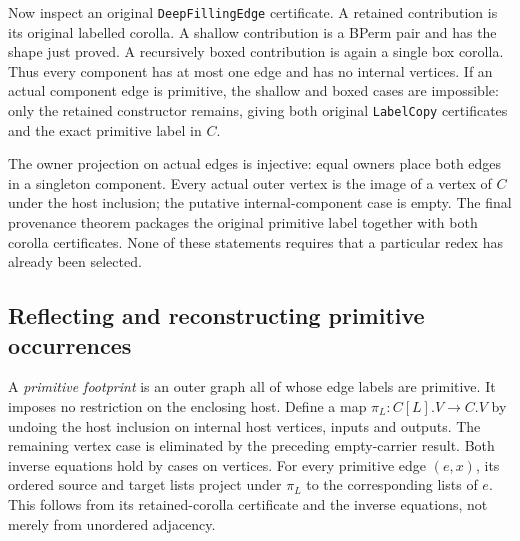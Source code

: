 
Now inspect an original \texttt{DeepFillingEdge} certificate. A retained
contribution is its original labelled corolla. A shallow contribution is a
BPerm pair and has the shape just proved. A recursively boxed contribution
is again a single box corolla. Thus every component has at most one edge and
has no internal vertices. If an actual component edge is primitive, the
shallow and boxed cases are impossible: only the retained constructor
remains, giving both original \texttt{LabelCopy} certificates and the exact
primitive label in $C$.


The owner projection on actual edges is injective: equal owners place both
edges in a singleton component. Every actual outer vertex is the image of
a vertex of $C$ under the host inclusion; the putative internal-component
case is empty. The final provenance theorem packages the original primitive
label together with both corolla certificates. None of these statements
requires that a particular redex has already been selected.


\subsection{Reflecting and reconstructing primitive occurrences}
A \emph{primitive footprint} is an outer graph all of whose edge labels are
primitive. It imposes no restriction on the enclosing host. Define a map
$\pi_L:C[L].V\to C.V$ by undoing the host inclusion on internal host vertices,
inputs and outputs. The remaining vertex case is eliminated by the preceding
empty-carrier result. Both inverse equations hold by cases on vertices.
For every primitive edge $(e,x)$, its ordered source and target lists project
under $\pi_L$ to the corresponding lists of $e$. This follows from its
retained-corolla certificate and the inverse equations, not merely from
unordered adjacency.

